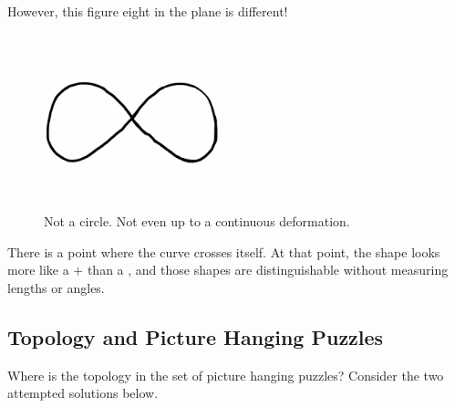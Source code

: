 \documentclass[12pt,letterpaper]{article}
\theoremstyle{definition}
\begin{document}
However, this figure eight in the plane is different!
\begin{figure}[h]
\centering
\includegraphics[height=2in]{phppics/fig8.png}
\caption{Not a circle. Not even up to a continuous deformation.}
\end{figure}

There is a point where the curve crosses itself.
At that point, the shape looks more like a $+$ than a \textbar, and those shapes are distinguishable without measuring lengths or angles.


\subsection*{Topology and Picture Hanging Puzzles}

Where is the topology in the set of picture hanging puzzles?
Consider the two attempted solutions below.
\end{document}
